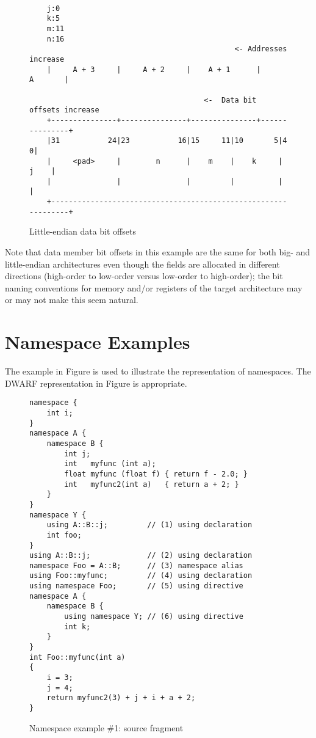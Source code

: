 \begin{figure}[ht]
\begin{dwflisting}
\begin{verbatim}

    j:0
    k:5
    m:11
    n:16
                                               <- Addresses increase
    |     A + 3     |     A + 2     |    A + 1      |       A       | 

                                        <-  Data bit offsets increase 
    +---------------+---------------+---------------+---------------+
    |31           24|23           16|15     11|10       5|4        0|
    |     <pad>     |        n      |    m    |    k     |     j    |
    |               |               |         |          |          |
    +---------------------------------------------------------------+

\end{verbatim}
\end{dwflisting}
\caption{Little-endian data bit offsets}
\label{fig:littleendiandatabitoffsets}
\end{figure}

Note that data member bit offsets in this example are the
same for both big- and little-endian architectures even
though the fields are allocated in different directions
(high-order to low-order versus low-order to high-order);
the bit naming conventions for memory and/or registers of
the target architecture may or may not make this seem natural.

\clearpage
\section{Namespace Examples}
\label{app:namespaceexamples}

The  example in 
Figure 
is used 
to illustrate the representation of namespaces.
The DWARF representation in 
Figure 
is appropriate.

\begin{figure}[ht]
\begin{lstlisting}
namespace {
    int i;
}
namespace A {
    namespace B {
        int j;
        int   myfunc (int a);
        float myfunc (float f) { return f - 2.0; }
        int   myfunc2(int a)   { return a + 2; }
    }
}
namespace Y {
    using A::B::j;         // (1) using declaration
    int foo;
}
using A::B::j;             // (2) using declaration
namespace Foo = A::B;      // (3) namespace alias
using Foo::myfunc;         // (4) using declaration
using namespace Foo;       // (5) using directive
namespace A {
    namespace B {
        using namespace Y; // (6) using directive
        int k;
    }
}
int Foo::myfunc(int a)
{
    i = 3;
    j = 4;
    return myfunc2(3) + j + i + a + 2;
}
\end{lstlisting}
\caption{Namespace example \#1: source fragment}
\label{fig:namespaceexample1sourcefragment}
\end{figure}


